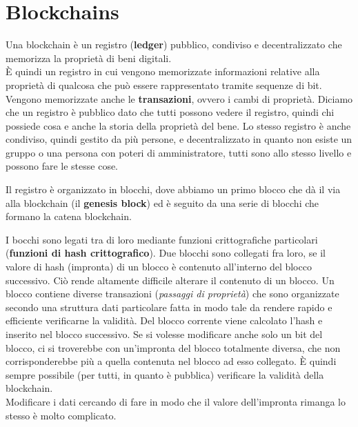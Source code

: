 \section{Blockchains}
Una blockchain è un registro (\textbf{ledger}) pubblico, condiviso e decentralizzato che memorizza la proprietà di beni digitali.\\
È quindi un registro in cui vengono memorizzate informazioni relative alla proprietà di qualcosa che può essere rappresentato tramite sequenze di bit. Vengono memorizzate anche le \textbf{transazioni}, ovvero i cambi di proprietà. Diciamo che un registro è pubblico dato che tutti possono vedere il registro, quindi chi possiede cosa e anche la storia della proprietà del bene.
Lo stesso registro è anche condiviso, quindi gestito da più persone, e decentralizzato in quanto non esiste un gruppo o una persona con poteri di amministratore, tutti sono allo stesso livello e possono fare le stesse cose. 

Il registro è organizzato in blocchi, dove abbiamo un primo blocco che dà il via alla blockchain (il \textbf{genesis block}) ed è seguito da una serie di blocchi che formano la catena blockchain.

I bocchi sono legati tra di loro mediante funzioni crittografiche particolari (\textbf{funzioni di hash crittografico}). Due blocchi sono collegati fra loro, se il valore di hash (impronta) di un blocco è contenuto all’interno del blocco successivo. Ciò rende altamente difficile alterare il contenuto di un blocco.
Un blocco contiene diverse transazioni (\textit{passaggi di proprietà}) che sono organizzate secondo una struttura dati particolare fatta in modo tale da rendere rapido e efficiente verificarne la validità. Del blocco corrente viene calcolato l’hash e inserito nel blocco successivo. Se si volesse modificare anche solo un bit del blocco, ci si troverebbe con un’impronta del blocco totalmente diversa, che non corrisponderebbe più a quella contenuta nel blocco ad esso collegato. È quindi sempre possibile (per tutti, in quanto è pubblica) verificare la validità della blockchain.\\
Modificare i dati cercando di fare in modo che il valore dell’impronta rimanga lo stesso è molto complicato.

